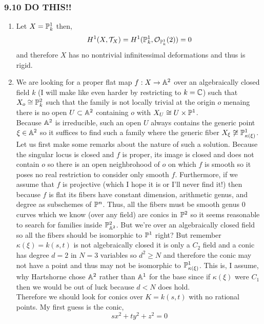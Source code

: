 \documentclass[12pt]{article}
\begin{document}
\subsubsection{9.10 DO THIS!!}

\begin{enumerate}
\item Let $X = \P^1_k$ then,
\[ H^1(X, \T_X) = H^1(\P^1_k, \struct{\P^1_k}(2)) = 0 \]
and therefore $X$ has no nontrivial infinitessimal deformations and thus is rigid.

\item We are looking for a proper flat map $f : X \to \A^2$ over an algebraically closed field $k$ (I will make like even harder by restricting to $k = \CC$) such that $X_o \cong \P^2_k$ such that the family is not locally trivial at the origin $o$ menaing there is no open $U \subset \A^2$ containing $o$ with $X_U \cong U \times \P^1$. 
\bigskip\\
Because $\A^2$ is irreducible, such an open $U$ always contains the generic point $\xi \in \A^2$ so it suffices to find such a family where the generic fiber $X_{\xi} \not\cong \P^1_{\kappa(\xi)}$. 
\bigskip\\
Let us first make some remarks about the nature of such a solution. Because the singular locus is closed and $f$ is proper, its image is closed and does not contain $o$ so there is an open neighbrohood of $o$ on which $f$ is smooth so it poses no real restriction to consider only smooth $f$. Furthermore, if we assume that $f$ is projective (which I hope it is or I'll never find it!) then because $f$ is flat its fibers have constant dimension, arithmetic genus, and degree as subschemes of $\P^n$. Thus, all the fibers must be smooth genus $0$ curves which we know (over any field) are conics in $\P^2$ so it seems reasonable to search for families inside $\P^2_{\A^2}$. But we're over an algebraically closed field so all the fibers should be isomorphic to $\P^1$ right? But remember $\kappa(\xi) = k(s,t)$ is not algebraically closed it is only a $C_2$ field and a conic has degree $d = 2$ in $N = 3$ variables so $d^2 \ge N$ and therefore the conic may not have a point and thus may not be isomorphic to $\P^1_{\kappa(\xi)}$. This is, I assume, why Hartshorne chose $\A^2$ rather than $\A^1$ for the base since if $\kappa(\xi)$ were $C_1$ then we would be out of luck because $d < N$ does hold.
\bigskip\\
Therefore we should look for conics over $K	 = k(s,t)$ with no rational points. My first guess is the conic,
\[ s x^2 + t y^2 + z^2 = 0 \]

\end{enumerate}
\end{document}
